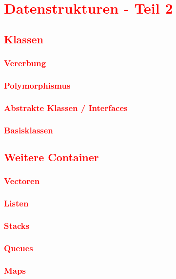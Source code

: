 \chapter{\textcolor{red}{Datenstrukturen - Teil 2}}\label{chap:datastructures-2}
\section{\textcolor{red}{Klassen}}\label{sec:classes-2}
\subsection{\textcolor{red}{Vererbung}}\label{sec:inheritance}
\subsection{\textcolor{red}{Polymorphismus}}\label{sec:polymorphism}
\subsection{\textcolor{red}{Abstrakte Klassen / Interfaces}}\label{sec:abstract-classes}
\subsection{\textcolor{red}{Basisklassen}}\label{sec:base-classes}
\section{\textcolor{red}{Weitere Container}}\label{sec:containers}
\subsection{\textcolor{red}{Vectoren}}\label{sec:vectors}
\subsection{\textcolor{red}{Listen}}\label{sec:lists}
\subsection{\textcolor{red}{Stacks}}\label{sec:stacks}
\subsection{\textcolor{red}{Queues}}\label{sec:queues}
\subsection{\textcolor{red}{Maps}}\label{sec:maps}
